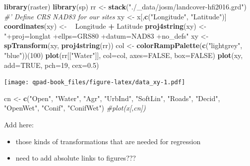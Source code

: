 \documentclass[12pt,]{book}
\newenvironment{Shaded}{\begin{snugshade}}{\end{snugshade}}
\newcommand{\CommentTok}[1]{\textcolor[rgb]{0.56,0.35,0.01}{\textit{#1}}}
\newcommand{\DataTypeTok}[1]{\textcolor[rgb]{0.13,0.29,0.53}{#1}}
\newcommand{\DecValTok}[1]{\textcolor[rgb]{0.00,0.00,0.81}{#1}}
\newcommand{\ErrorTok}[1]{\textcolor[rgb]{0.64,0.00,0.00}{\textbf{#1}}}
\newcommand{\FloatTok}[1]{\textcolor[rgb]{0.00,0.00,0.81}{#1}}
\newcommand{\KeywordTok}[1]{\textcolor[rgb]{0.13,0.29,0.53}{\textbf{#1}}}
\newcommand{\NormalTok}[1]{#1}
\newcommand{\OperatorTok}[1]{\textcolor[rgb]{0.81,0.36,0.00}{\textbf{#1}}}
\newcommand{\OtherTok}[1]{\textcolor[rgb]{0.56,0.35,0.01}{#1}}
\newcommand{\StringTok}[1]{\textcolor[rgb]{0.31,0.60,0.02}{#1}}
\providecommand{\tightlist}{%
  \setlength{\itemsep}{0pt}\setlength{\parskip}{0pt}}
\begin{document}
\begin{Shaded}
\begin{Highlighting}[]
\KeywordTok{library}\NormalTok{(raster)}
\KeywordTok{library}\NormalTok{(sp)}
\NormalTok{rr <-}\StringTok{ }\KeywordTok{stack}\NormalTok{(}\StringTok{"./_data/josm/landcover-hfi2016.grd"}\NormalTok{)}
\CommentTok{#' Define CRS NAD83 for our sites}
\NormalTok{xy <-}\StringTok{ }\NormalTok{x[,}\KeywordTok{c}\NormalTok{(}\StringTok{"Longitude"}\NormalTok{, }\StringTok{"Latitude"}\NormalTok{)]}
\KeywordTok{coordinates}\NormalTok{(xy) <-}\StringTok{ }\ErrorTok{~}\StringTok{ }\NormalTok{Longitude }\OperatorTok{+}\StringTok{ }\NormalTok{Latitude}
\KeywordTok{proj4string}\NormalTok{(xy) <-}\StringTok{ "+proj=longlat +ellps=GRS80 +datum=NAD83 +no_defs"}
\NormalTok{xy <-}\StringTok{ }\KeywordTok{spTransform}\NormalTok{(xy, }\KeywordTok{proj4string}\NormalTok{(rr))}
\NormalTok{col <-}\StringTok{ }\KeywordTok{colorRampPalette}\NormalTok{(}\KeywordTok{c}\NormalTok{(}\StringTok{"lightgrey"}\NormalTok{, }\StringTok{"blue"}\NormalTok{))(}\DecValTok{100}\NormalTok{)}
\KeywordTok{plot}\NormalTok{(rr[[}\StringTok{"Water"}\NormalTok{]], }\DataTypeTok{col=}\NormalTok{col, }\DataTypeTok{axes=}\OtherTok{FALSE}\NormalTok{, }\DataTypeTok{box=}\OtherTok{FALSE}\NormalTok{)}
\KeywordTok{plot}\NormalTok{(xy, }\DataTypeTok{add=}\OtherTok{TRUE}\NormalTok{, }\DataTypeTok{pch=}\DecValTok{19}\NormalTok{, }\DataTypeTok{cex=}\FloatTok{0.5}\NormalTok{)}
\end{Highlighting}
\end{Shaded}

\texttt{[image: qpad-book\_files/figure-latex/data\_xy-1.pdf]}

\begin{Shaded}
\begin{Highlighting}[]
\NormalTok{cn <-}\StringTok{ }\KeywordTok{c}\NormalTok{(}\StringTok{"Open"}\NormalTok{, }\StringTok{"Water"}\NormalTok{, }\StringTok{"Agr"}\NormalTok{, }\StringTok{"UrbInd"}\NormalTok{, }\StringTok{"SoftLin"}\NormalTok{, }\StringTok{"Roads"}\NormalTok{, }
  \StringTok{"Decid"}\NormalTok{, }\StringTok{"OpenWet"}\NormalTok{, }\StringTok{"Conif"}\NormalTok{, }\StringTok{"ConifWet"}\NormalTok{)}
\CommentTok{#plot(x[,cn])}
\end{Highlighting}
\end{Shaded}

Add here:

\begin{itemize}
\tightlist
\item
  those kinds of transformations that are needed for regression
\item
  need to add absolute links to figures???
\end{itemize}
\end{document}
